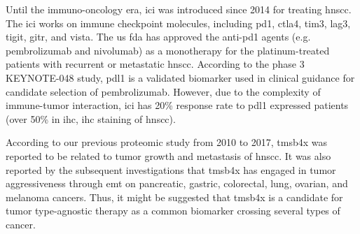 \documentclass[jpm,article,submit,moreauthors,pdftex]{Definitions/mdpi}
\begin{document}
Until the immuno-oncology era, \acrfull{ici} was introduced since 2014 for treating \acrshort{hnscc}\cite{Seiwert2014}\cite{Swanson2015}.
The \acrshort{ici} works on immune checkpoint molecules, including \acrfull{pd1}, \acrfull{ctla4}, \acrfull{tim3}, \acrfull{lag3}, \acrfull{tigit}, \acrfull{gitr}, and \acrfull{vista}\cite{Mei2020}.
The \acrshort{us} \acrshort{fda} has approved the anti-\acrshort{pd1} agents (e.g. pembrolizumab and nivolumab) as a monotherapy for the platinum-treated patients with recurrent or metastatic \acrshort{hnscc}\cite{Cramer2019}. 
According to the phase 3 KEYNOTE-048 study, \acrshort{pdl1} is a validated biomarker used in clinical guidance for candidate selection of pembrolizumab\cite{Burtness2019}\cite{Gavrielatou2020}.
However, due to the complexity of immune-tumor interaction, \acrshort{ici} has 20\% response rate to \acrfull{pdl1} expressed patients (over 50\% in \acrlong{ihc}, \acrshort{ihc} staining of \acrshort{hnscc})\cite{Swanson2015}\cite{Gavrielatou2020}.

According to our previous proteomic study from 2010 to 2017, \acrfull{tmsb4x} was reported to be related to tumor growth and metastasis of \acrshort{hnscc}\cite{Chi2017}. It was also reported by the subsequent investigations that \acrshort{tmsb4x} has engaged in tumor aggressiveness through \acrfull{emt} on pancreatic\cite{Zhang2008}, gastric\cite{Ryu2012}, colorectal\cite{Gemoll2015}, lung\cite{Huang2016}, ovarian\cite{Chu2019}, and melanoma\cite{Makowiecka2019} cancers. Thus, it might be suggested that \acrshort{tmsb4x}  is a candidate for tumor type-agnostic therapy\cite{Yan2018} as a common biomarker crossing several types of cancer.
\end{document}
